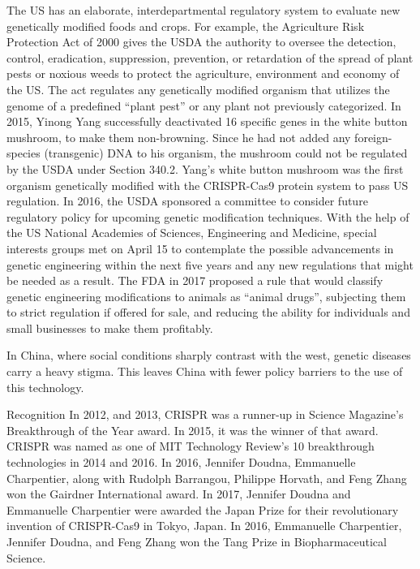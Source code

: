 The US has an elaborate, interdepartmental regulatory system to evaluate new genetically modified foods and crops. For example, the Agriculture Risk Protection Act of 2000 gives the USDA the authority to oversee the detection, control, eradication, suppression, prevention, or retardation of the spread of plant pests or noxious weeds to protect the agriculture, environment and economy of the US. The act regulates any genetically modified organism that utilizes the genome of a predefined ``plant pest'' or any plant not previously categorized. In 2015, Yinong Yang successfully deactivated 16 specific genes in the white button mushroom, to make them non-browning. Since he had not added any foreign-species (transgenic) DNA to his organism, the mushroom could not be regulated by the USDA under Section 340.2. Yang's white button mushroom was the first organism genetically modified with the CRISPR-Cas9 protein system to pass US regulation. In 2016, the USDA sponsored a committee to consider future regulatory policy for upcoming genetic modification techniques. With the help of the US National Academies of Sciences, Engineering and Medicine, special interests groups met on April 15 to contemplate the possible advancements in genetic engineering within the next five years and any new regulations that might be needed as a result. The FDA in 2017 proposed a rule that would classify genetic engineering modifications to animals as ``animal drugs'', subjecting them to strict regulation if offered for sale, and reducing the ability for individuals and small businesses to make them profitably.

In China, where social conditions sharply contrast with the west, genetic diseases carry a heavy stigma. This leaves China with fewer policy barriers to the use of this technology.

Recognition
In 2012, and 2013, CRISPR was a runner-up in Science Magazine's Breakthrough of the Year award. In 2015, it was the winner of that award. CRISPR was named as one of MIT Technology Review's 10 breakthrough technologies in 2014 and 2016. In 2016, Jennifer Doudna, Emmanuelle Charpentier, along with Rudolph Barrangou, Philippe Horvath, and Feng Zhang won the Gairdner International award. In 2017, Jennifer Doudna and Emmanuelle Charpentier were awarded the Japan Prize for their revolutionary invention of CRISPR-Cas9 in Tokyo, Japan. In 2016, Emmanuelle Charpentier, Jennifer Doudna, and Feng Zhang won the Tang Prize in Biopharmaceutical Science.


